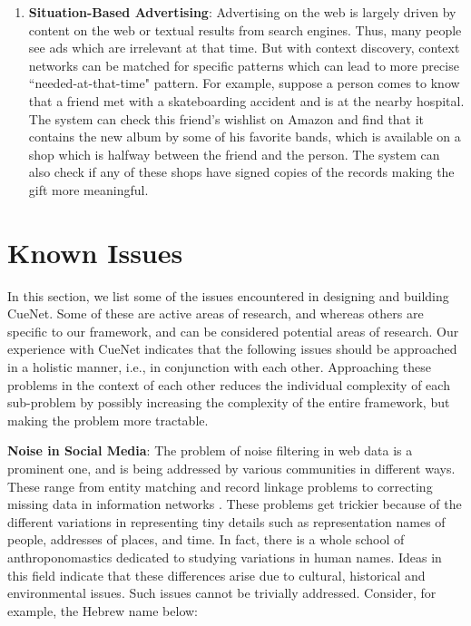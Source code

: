 \begin{enumerate}
  \item \textbf{Situation-Based Advertising}: Advertising on the web is largely driven by content on the web or textual results from search engines. Thus, many people see ads which are irrelevant at that time. But with context discovery, context networks can be matched for specific patterns which can lead to more precise ``needed-at-that-time" pattern. For example, suppose a person comes to know that a friend met with a skateboarding accident and is at the nearby hospital. The system can check this friend's wishlist on Amazon and find that it contains the new album by some of his favorite bands, which is available on a shop which is halfway between the friend and the person. The system can also check if any of these shops have signed copies of the records making the gift more meaningful.


\end{enumerate}

\section{Known Issues}
In this section, we list some of the issues encountered in designing and building CueNet. Some of these are active areas of research, and whereas others are specific to our framework, and can be considered potential areas of research. Our experience with CueNet indicates that the following issues should be approached in a holistic manner, i.e., in conjunction with each other. Approaching these problems in the context of each other reduces the individual complexity of each sub-problem by possibly increasing the complexity of the entire framework, but making the problem more tractable.

\textbf{\textbf{Noise in Social Media}}: The problem of noise filtering in web data is a prominent one, and is being addressed by various communities in different ways. These range from entity matching and record linkage problems \cite{elmagarmid2007duplicate} to correcting missing data in information networks \cite{sadikov2011correcting}. These problems get trickier because of the different variations in representing tiny details such as representation names of people, addresses of places, and time. In fact, there is a whole school of anthroponomastics \cite{schneider2009s} dedicated to studying variations in human names. Ideas in this field indicate that these differences arise due to cultural, historical and environmental issues\cite{al2009socio}. Such issues cannot be trivially addressed. Consider, for example, the Hebrew name below:


